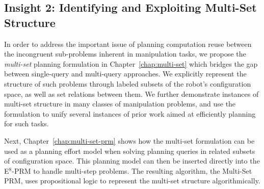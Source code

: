 
\subsection*{Insight 2: Identifying and Exploiting Multi-Set
   Structure}

In order to address the important issue of planning computation
reuse between the incongruent sub-problems inherent in manipulation
tasks,
we propose the \emph{multi-set} planning formulation
in Chapter~\ref{chap:multi-set}
which bridges the gap between single-query and multi-query approaches.
We explicitly represent the structure of such problems
through labeled subsets of the robot's configuration space,
as well as set relations between them.
We further demonstrate instances of multi-set structure
in many classes of manipulation problems,
and use the formulation to unify several instances of
prior work aimed at efficiently planning for such tasks.

Next, Chapter~\ref{chap:multi-set-prm}
shows how the multi-set formulation can be used as a
planning effort model
when solving planning queries in related subsets of configuration space.
This planning model can then be inserted directly into the 
E$^8$-PRM to handle multi-step problems.
The resulting algorithm,
the Multi-Set PRM,
uses propositional logic to represent the multi-set structure
algorithmically.

